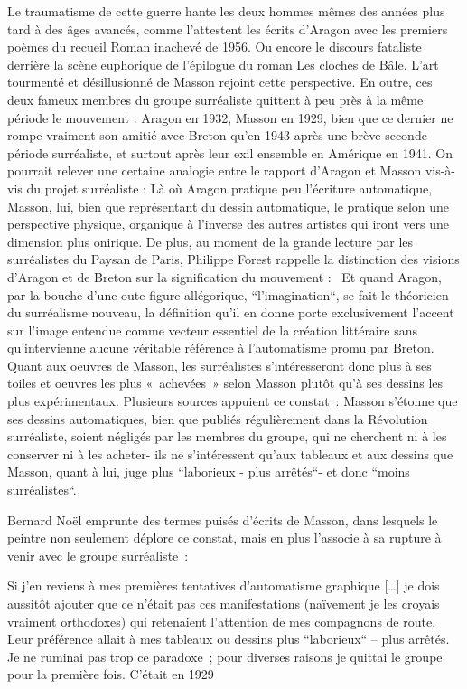 	 Le traumatisme de cette guerre hante les deux hommes mêmes des années plus tard à des âges avancés, comme l’attestent les écrits d’Aragon avec les premiers poèmes du recueil Roman inachevé de 1956. Ou encore  le discours fataliste derrière la scène euphorique de l’épilogue du roman Les cloches de Bâle. L’art tourmenté et désillusionné de Masson rejoint cette perspective. En outre, ces deux fameux membres du groupe surréaliste quittent à peu près à la même période le mouvement : Aragon en 1932, Masson en 1929, bien que ce dernier ne rompe vraiment son amitié avec Breton qu’en 1943 après une brève seconde période surréaliste, et surtout après leur exil ensemble en Amérique en 1941. On pourrait relever une certaine analogie entre le rapport d’Aragon et Masson vis-à-vis du projet surréaliste : Là où Aragon pratique peu l’écriture automatique, Masson, lui, bien que représentant du dessin automatique, le pratique selon une perspective physique, organique à l’inverse des autres artistes qui iront vers une dimension plus onirique. De plus, au moment de la grande lecture par les surréalistes du Paysan de Paris, Philippe Forest rappelle la distinction des visions d’Aragon et de Breton sur la signification du mouvement : 
 Et quand Aragon, par la bouche d’une oute figure allégorique, “l’imagination“, se fait le théoricien du surréalisme nouveau, la définition qu’il en donne porte exclusivement l’accent sur l’image entendue comme vecteur essentiel de la création littéraire sans qu’intervienne aucune véritable référence à l’automatisme promu par Breton.
	 Quant aux oeuvres de Masson, les surréalistes s’intéresseront donc plus à ses toiles et oeuvres les plus « achevées » selon Masson plutôt qu’à ses dessins les plus expérimentaux. Plusieurs sources appuient ce constat : 
Masson s’étonne que ses dessins automatiques, bien que publiés régulièrement dans la Révolution surréaliste, soient négligés par les membres du groupe, qui ne cherchent ni à les conserver ni à les acheter- ils ne s’intéressent qu’aux tableaux et aux dessins que Masson, quant à lui, juge plus “laborieux - plus arrêtés“- et donc “moins surréalistes“. 

Bernard Noël emprunte des termes puisés d’écrits de Masson, dans lesquels le peintre non seulement déplore ce constat, mais en plus l’associe à sa rupture à venir avec le groupe surréaliste : 

Si j’en reviens à mes premières tentatives d’automatisme graphique […] je dois aussitôt ajouter que ce n’était pas ces manifestations (naïvement je les croyais vraiment orthodoxes) qui retenaient l’attention de mes compagnons de route. Leur préférence allait à mes tableaux ou dessins  plus “laborieux“ – plus arrêtés. Je ne ruminai pas trop ce paradoxe ; pour diverses raisons je quittai le groupe pour la première fois. C’était en 1929

